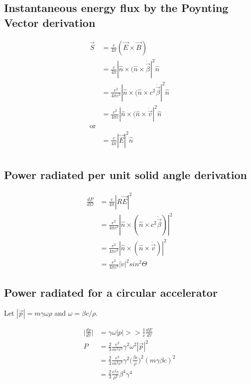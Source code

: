 \documentclass[a4paper]{article}
\begin{document}
\begin{center}
\subsection{Instantaneous energy flux by the Poynting Vector derivation}
\end{center}
\begin{align*}
    \vec{S} &= \frac{c}{4 \pi}(\vec{E} \times \vec{B}) \\
    &= \frac{c}{4 \pi} |\hat{n} \times (\hat{n} \times \dot{\vec{\beta}}|^{2}\hat{n} \\
    &= \frac{e^{2}}{4 \pi c^{3}} |\hat{n} \times (\hat{n} \times c^{2}\dot{\vec{\beta}}|^{2}\hat{n} \\
    &= \frac{e^{2}}{4 \pi c}  |\hat{n} \times (\hat{n} \times \dot{\vec{v}}|^{2}\hat{n} \\
    \text{or} \\
    &= \frac{c}{4 \pi} |\vec{E}|^{2}\hat{n} \\
\end{align*}

\begin{center}
\subsection{Power radiated per unit solid angle derivation}
\end{center}

\begin{align*}
\frac{dP}{d\Omega} &= \frac{c}{4 \pi} |R\vec{E}|^{2} \\
&= \frac{e^{2}}{4 \pi c^{3}}  |\hat{n} \times (\hat{n} \times c^{2}\dot{\vec{\beta}})|^{2} \\
&= \frac{e^{2}}{4 \pi c^{3}}  |\hat{n} \times (\hat{n} \times \dot{\vec{v}})|^{2} \\
&= \frac{e^{2}}{4\pi c^{3}} |\dot{v}|^{2} sin^{2} \Theta
\end{align*}

\begin{center}
\subsection{Power radiated for a circular accelerator}
\end{center}

Let $|\vec{p}| = m \gamma \omega \rho$ and $\omega = \beta c / \rho$.

\begin{align*}
\Big|\frac{dp}{d \tau}\Big| &= \gamma \omega |p| >> \frac{1}{c} \frac{dE}{d\tau} \\
P &= \frac{2}{3} \frac{e^{2}}{m^{2}c^{3}} \gamma^{2} \omega^{2} |\vec{p}|^{2}\\
  &= \frac{2}{3} \frac{e^{2}}{m^{2}c^{3}} \gamma^{2}\Bigg(\frac{\beta c}{\rho}\Bigg)^{2} (m \gamma \beta c)^{2}\\
  &= \frac{2}{3} \frac{e^{2} c}{\rho^{2}} \beta^{4} \gamma^{4}
\end{align*}
\end{document}
